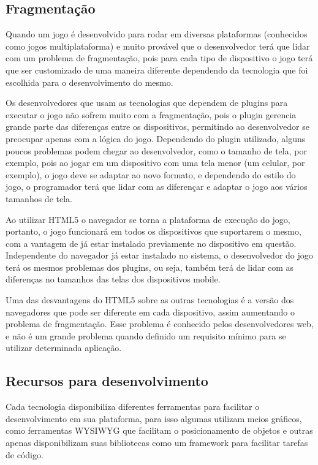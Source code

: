 \subsection{Fragmentação}

Quando um jogo é desenvolvido para rodar em diversas plataformas
(conhecidos como jogos multiplataforma) e muito provável que o
desenvolvedor terá que lidar com um problema de fragmentação, pois
para cada tipo de dispositivo o jogo terá que ser customizado de uma
maneira diferente dependendo da tecnologia que foi escolhida para o
desenvolvimento do mesmo.

Os desenvolvedores que usam as tecnologias que dependem de plugins para executar o
jogo não sofrem muito com a fragmentação, pois o plugin gerencia
grande parte das diferenças entre os dispositivos, permitindo ao
desenvolvedor se preocupar apenas com a lógica do jogo. Dependendo do
plugin utilizado, alguns poucos problemas podem chegar ao
desenvolvedor, como o tamanho de tela, por exemplo, pois ao jogar em
um dispositivo com uma tela menor (um celular, por exemplo), o jogo
deve se adaptar ao novo formato, e dependendo do estilo do jogo, o
programador terá que lidar com as diferençar e adaptar o jogo aos
vários tamanhos de tela.

Ao utilizar HTML5 o navegador se torna a plataforma de execução do
jogo, portanto, o jogo funcionará em todos os dispositivos que
suportarem o mesmo, com a vantagem de já estar instalado previamente
no dispositivo em questão.
Independente do navegador já estar instalado no sistema, o
desenvolvedor do jogo terá os mesmos problemas dos plugins, ou seja,
também terá de lidar com as diferenças no tamanhos das telas dos
dispositivos mobile.

Uma das desvantagens do HTML5 sobre as outras tecnologias é a versão
dos navegadores que pode ser diferente em cada dispositivo, assim
aumentando o problema de fragmentação. Esse problema é conhecido pelos
desenvolvedores web, e não é um grande problema quando definido um
requisito mínimo para se utilizar determinada aplicação.

\subsection{Recursos para desenvolvimento}

Cada tecnologia disponibiliza diferentes ferramentas para facilitar o
desenvolvimento em sua plataforma, para isso algumas utilizam meios
gráficos, como ferramentas WYSIWYG que facilitam o posicionamento de
objetos e outras apenas disponibilizam suas bibliotecas como um
framework para facilitar tarefas de código.

